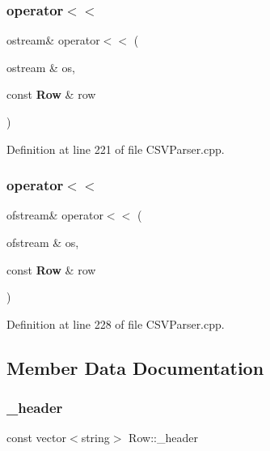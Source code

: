\subsubsection{operator$<$$<$\hspace{0.1cm}{\footnotesize\ttfamily [1/2]}}
{\footnotesize\ttfamily ostream\& operator$<$$<$ (\begin{DoxyParamCaption}\item[{ostream \&}]{os,  }\item[{const \textbf{ Row} \&}]{row }\end{DoxyParamCaption})\hspace{0.3cm}{\ttfamily [friend]}}



Definition at line 221 of file C\+S\+V\+Parser.\+cpp.

\mbox{\label{class_row_ad4e8b6c4b0238a50bde8e99ec8a0dcb0}} 
\subsubsection{operator$<$$<$\hspace{0.1cm}{\footnotesize\ttfamily [2/2]}}
{\footnotesize\ttfamily ofstream\& operator$<$$<$ (\begin{DoxyParamCaption}\item[{ofstream \&}]{os,  }\item[{const \textbf{ Row} \&}]{row }\end{DoxyParamCaption})\hspace{0.3cm}{\ttfamily [friend]}}



Definition at line 228 of file C\+S\+V\+Parser.\+cpp.



\subsection{Member Data Documentation}
\mbox{\label{class_row_a98603a15923aa97e15198393ef3080c0}} 
\subsubsection{\_header}
{\footnotesize\ttfamily const vector$<$string$>$ Row\+::\+\_\+header\hspace{0.3cm}{\ttfamily [private]}}




